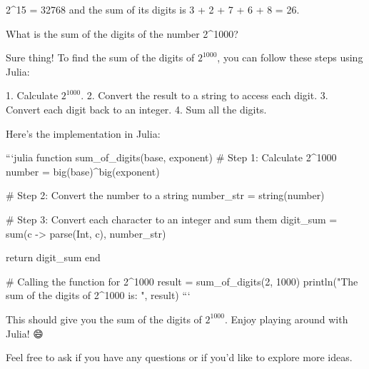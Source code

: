 2^15 = 32768 and the sum of its digits is 3 + 2 + 7 + 6 + 8 = 26.
 
What is the sum of the digits of the number 2^{1000}?


Sure thing! To find the sum of the digits of \(2^{1000}\), you can follow these steps using Julia:

1. Calculate \(2^{1000}\).
2. Convert the result to a string to access each digit.
3. Convert each digit back to an integer.
4. Sum all the digits.

Here's the implementation in Julia:

```julia
function sum_of_digits(base, exponent)
    # Step 1: Calculate 2^1000
    number = big(base)^big(exponent)
    
    # Step 2: Convert the number to a string
    number_str = string(number)
    
    # Step 3: Convert each character to an integer and sum them
    digit_sum = sum(c -> parse(Int, c), number_str)
    
    return digit_sum
end

# Calling the function for 2^1000
result = sum_of_digits(2, 1000)
println("The sum of the digits of 2^1000 is: ", result)
```

This should give you the sum of the digits of \(2^{1000}\). Enjoy playing around with Julia! 😄

Feel free to ask if you have any questions or if you'd like to explore more ideas.